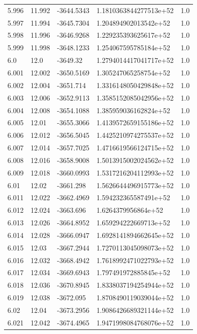 \begin{tabular}{lllll}
5.996 & 11.992 & -3644.5343 & 1.1810363844277513e+52 & 1.0 \\
5.997 & 11.994 & -3645.7304 & 1.204894902013542e+52 & 1.0 \\
5.998 & 11.996 & -3646.9268 & 1.229235393625617e+52 & 1.0 \\
5.999 & 11.998 & -3648.1233 & 1.254067595785184e+52 & 1.0 \\
6.0 & 12.0 & -3649.32 & 1.2794014417041717e+52 & 1.0 \\
6.001 & 12.002 & -3650.5169 & 1.305247065258754e+52 & 1.0 \\
6.002 & 12.004 & -3651.714 & 1.3316148050429848e+52 & 1.0 \\
6.003 & 12.006 & -3652.9113 & 1.3585152085042956e+52 & 1.0 \\
6.004 & 12.008 & -3654.1088 & 1.385959036162824e+52 & 1.0 \\
6.005 & 12.01 & -3655.3066 & 1.4139572659155186e+52 & 1.0 \\
6.006 & 12.012 & -3656.5045 & 1.4425210974275537e+52 & 1.0 \\
6.007 & 12.014 & -3657.7025 & 1.4716619566124715e+52 & 1.0 \\
6.008 & 12.016 & -3658.9008 & 1.5013915002024562e+52 & 1.0 \\
6.009 & 12.018 & -3660.0993 & 1.5317216204112993e+52 & 1.0 \\
6.01 & 12.02 & -3661.298 & 1.5626644496915773e+52 & 1.0 \\
6.011 & 12.022 & -3662.4969 & 1.594232365587491e+52 & 1.0 \\
6.012 & 12.024 & -3663.696 & 1.6264379956864e+52 & 1.0 \\
6.013 & 12.026 & -3664.8952 & 1.659294222669713e+52 & 1.0 \\
6.014 & 12.028 & -3666.0947 & 1.6928141894662645e+52 & 1.0 \\
6.015 & 12.03 & -3667.2944 & 1.7270113045098073e+52 & 1.0 \\
6.016 & 12.032 & -3668.4942 & 1.7618992471022793e+52 & 1.0 \\
6.017 & 12.034 & -3669.6943 & 1.797491972885845e+52 & 1.0 \\
6.018 & 12.036 & -3670.8945 & 1.8338037194254944e+52 & 1.0 \\
6.019 & 12.038 & -3672.095 & 1.8708490119039044e+52 & 1.0 \\
6.02 & 12.04 & -3673.2956 & 1.9086426689321144e+52 & 1.0 \\
6.021 & 12.042 & -3674.4965 & 1.9471998084768076e+52 & 1.0 \\

\end{tabular}

